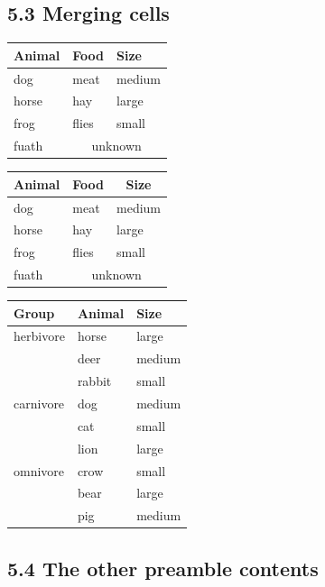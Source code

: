 \documentclass{article}
\begin{document}
\subsection*{ 5.3 Merging cells}

 \begin{tabular}{lll}
 \toprule
 Animal & Food & Size \\
 \midrule
 dog & meat & medium \\
 horse & hay & large \\
 frog & flies & small \\
 fuath & \multicolumn{2}{c}{unknown} \\
 \bottomrule
 \end{tabular}

\vspace{2em}

 \begin{tabular}{lll}
 \toprule
 \multicolumn{1}{c}{Animal} & \multicolumn{1}{c}{Food} & \multicolumn{1}{c}{Size} \\
 \midrule
 dog & meat & medium \\
 horse & hay & large \\
 frog & flies & small \\
 fuath & \multicolumn{2}{c}{unknown} \\
 \bottomrule
 \end{tabular}

\vspace{2em}


 \begin{tabular}{lll}
 \toprule
 Group & Animal & Size \\
 \midrule
 herbivore 	& horse & large \\
 		& deer & medium \\
 		& rabbit & small \\
 \addlinespace
 carnivore 	& dog
 		& medium \\
		& cat & small \\
 		& lion & large \\
 \addlinespace
 omnivore 	& crow & small \\
		& bear & large \\
		& pig & medium \\
 \bottomrule
\end{tabular}

\vspace{2em}

\subsection*{ 5.4 The other preamble contents}
\end{document}
